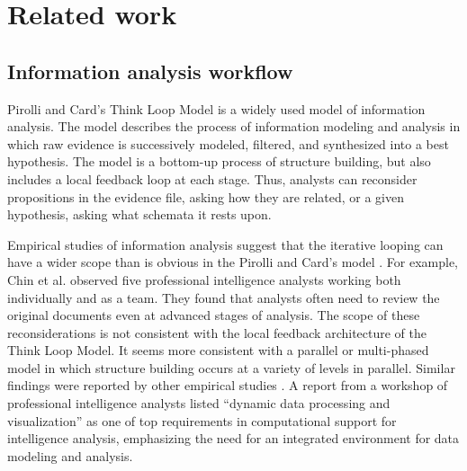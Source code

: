 \section{Related work}\label{related-work}

\subsection{Information analysis workflow}

Pirolli and Card's Think Loop Model \cite{Pirolli2005} is a widely used model of information analysis. The model describes the process of information modeling and analysis in which raw evidence is successively modeled, filtered, and synthesized into a best hypothesis. The model is a bottom-up process of structure building, but also includes a local feedback loop at each stage. Thus, analysts can reconsider propositions in the evidence file, asking how they are related, or a given hypothesis, asking what schemata it rests upon.

Empirical studies of information analysis suggest that the iterative looping can
have a wider scope than is obvious in the Pirolli and Card's model
\cite{Pirolli2005}. For example, Chin et al. \cite{Chin2009} observed five
professional intelligence analysts working both individually and as a team. They
found that analysts often need to review the original documents even at advanced
stages of analysis. The scope of these reconsiderations is not consistent with
the local feedback architecture of the Think Loop Model. It seems more
consistent with a parallel or multi-phased model \cite{Wheaton2011} in which
structure building occurs at a variety of levels in parallel. Similar findings
were reported by other empirical studies
\cite{Isenberg2008b,Kang2011,Herrmann2013a}. A report \cite{Badalamente2005}
from a workshop of professional intelligence analysts listed ``dynamic data
processing and visualization'' as one of top requirements in computational
support for intelligence analysis, emphasizing the need for an integrated
environment for data modeling and analysis.

